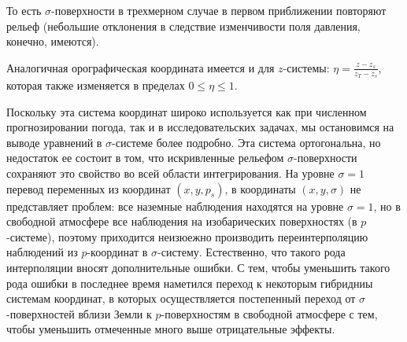 То есть $\sigma$-поверхности в трехмерном случае в первом приближении повторяют рельеф (небольшие отклонения в следствие изменчивости поля давления, конечно, имеются).

Аналогичная орографическая координата имеется и для $z$-системы: $\eta=\frac{z-z_s}{z_T-z_s}$, которая также изменяется в пределах $0\leq\eta\leq1$.

Поскольку эта система координат широко используется как при численном прогнозировании погода, так и в исследовательских задачах, мы остановимся на выводе уравнений в $\sigma$-системе более подробно. Эта система ортогональна, но недостаток ее состоит в том, что искривленные рельефом $\sigma$-поверхности сохраняют это свойство во всей области интегрирования. На уровне $\sigma=1$ перевод переменных из координат $(x,y,p_s)$, в координаты $(x,y,\sigma)$ не представляет проблем: все наземные наблюдения находятся на уровне $\sigma=1$, но в свободной атмосфере все наблюдения на изобарических поверхностях (в $p$-системе), поэтому приходится неизюежно производить переинтерполяцию наблюдений из $p$-координат в $\sigma$-систему. Естественно, что такого рода интерполяции вносят дополнительные ошибки. С тем, чтобы уменьшить такого рода ошибки в последнее время наметился переход к некоторым гибридниы системам координат, в которых осуществляется постепенный переход от $\sigma$-поверхностей вблизи Земли к $p$-поверхностям в свободной атмосфере с тем, чтобы уменьшить отмеченные много выше отрицательные эффекты. 

